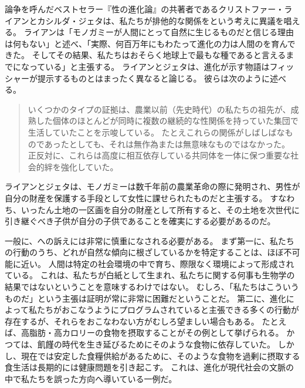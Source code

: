 \documentclass[paper=a4,book,openany]{jlreq}
\begin{document}
論争を呼んだベストセラー『性の進化論』\citep{ryan10:_sex_dawn}の共著者であるクリストファー・ライアンとカシルダ・ジェタは、私たちが排他的な関係をという考えに異議を唱える。
ライアンは「モノガミーが人間にとって自然に生じるものだと信じる理由は何もない」と述べ、「実際、何百万年にもわたって進化の力は人間のを育んできた。
そしてその結果、私たちはおそらく地球上で最もな種であると言えるまでになっている」と主張する\citep{ryan10:_monog_unnat_our_sexy_species}。
ライアンとジェタは、進化が示す物語はフィッシャーが提示するものとはまったく異なると論じる。
彼らは次のように述べる。

\begin{quote}

いくつかのタイプの証拠は、農業以前（先史時代）の私たちの祖先が、成熟した個体のほとんどが同時に複数の継続的な性関係を持っていた集団で生活していたことを示唆している。
たとえこれらの関係がしばしばなものであったとしても、それは無作為または無意味なものではなかった。
正反対に、これらは高度に相互依存している共同体を一体に保つ重要な社会的絆を強化していた。
\citep[pp.9--10]{ryan10:_sex_dawn}
\end{quote}

ライアンとジェタは、モノガミーは数千年前の農業革命の際に発明され、男性が自分の財産を保護する手段として女性に課せられたものだと主張する。
すなわち、いったん土地の一区画を自分の財産として所有すると、その土地を次世代に引き継ぐべき子供が自分の子供であることを確実にする必要があるのだ。

一般に、への訴えには非常に慎重になされる必要がある。
まず第一に、私たちの行動のうち、どれが自然な傾向に根ざしているかを特定することは、ほぼ不可能に近い。
人間は特定の社会環境の中で育ち、際限なく環境によって形成されている。
これは、私たちが白紙として生まれ、私たちに関する何事も生物学の結果ではないということを意味するわけではない。
むしろ、「私たちはこういうものだ」という主張は証明が常に非常に困難だということだ。
第二に、進化によって私たちがおこなうようにプログラムされていると主張できる多くの行動が存在するが、それらをおこなわない方がむしろ望ましい場合もある。
たとえば、高脂肪・高カロリーの食物を摂取することがその例として挙げられる。
かつては、飢饉の時代を生き延びるためにそのような食物に依存していた。
しかし、現在では安定した食糧供給があるために、そのような食物を過剰に摂取する食生活は長期的には健康問題を引き起こす。
これは、進化が現代社会の文脈の中で私たちを誤った方向へ導いている一例だ。
\end{document}
